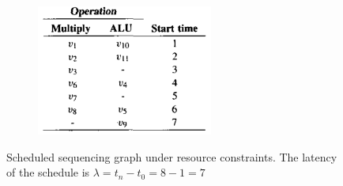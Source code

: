 \begin{figure}[H]
\begin{subfigure}[b]{0.3\textwidth}
    \end{subfigure}
    \quad\quad\quad
    \begin{subfigure}[b]{0.4\textwidth}
        \includegraphics[width=\textwidth]{./Cap3/Images/Image20.png}
    \end{subfigure}
    \caption[Optional caption]{Scheduled  sequencing  graph  under  resource constraints. The latency of the schedule is $ \lambda=t_{n}-t_{0} = 8-1=7 $}
    \label{fig:ExaSeqCons}
\end{figure}

